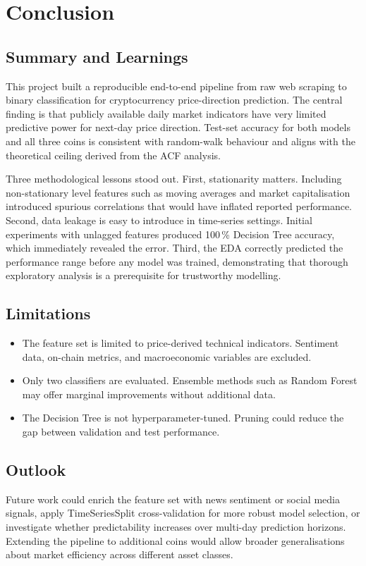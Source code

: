 \section{Conclusion}

\subsection*{Summary and Learnings}

This project built a reproducible end-to-end pipeline from raw web scraping to binary classification
for cryptocurrency price-direction prediction.
The central finding is that publicly available daily market indicators have very limited predictive
power for next-day price direction.
Test-set accuracy for both models and all three coins is consistent with random-walk behaviour and
aligns with the theoretical ceiling derived from the ACF analysis.

Three methodological lessons stood out.
First, stationarity matters. Including non-stationary level features such as moving averages and
market capitalisation introduced spurious correlations that would have inflated reported performance.
Second, data leakage is easy to introduce in time-series settings. Initial experiments with unlagged
features produced 100\,\% Decision Tree accuracy, which immediately revealed the error.
Third, the EDA correctly predicted the performance range before any model was trained, demonstrating
that thorough exploratory analysis is a prerequisite for trustworthy modelling.

\subsection*{Limitations}

\begin{itemize}[itemsep=0pt,topsep=3pt]
  \item The feature set is limited to price-derived technical indicators. Sentiment data, on-chain
        metrics, and macroeconomic variables are excluded.
  \item Only two classifiers are evaluated. Ensemble methods such as Random Forest may offer marginal
        improvements without additional data.
  \item The Decision Tree is not hyperparameter-tuned. Pruning could reduce the gap between
        validation and test performance.
\end{itemize}

\subsection*{Outlook}

Future work could enrich the feature set with news sentiment or social media signals, apply
TimeSeriesSplit cross-validation for more robust model selection, or investigate whether
predictability increases over multi-day prediction horizons.
Extending the pipeline to additional coins would allow broader generalisations about market
efficiency across different asset classes.

